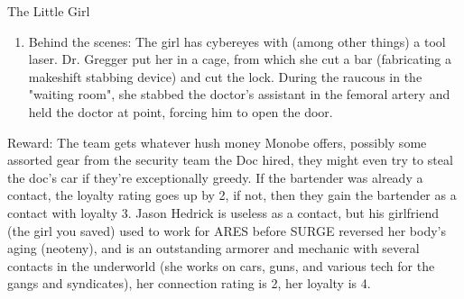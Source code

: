 \begin{scenario}{The Little Girl}
\begin{enumerate}
\item Behind the scenes: The girl has cybereyes with (among other things) a tool laser. Dr. Gregger put her in a cage, from which she cut a bar (fabricating a makeshift stabbing device) and cut the lock. During the raucous in the "waiting room", she stabbed the doctor's assistant in the femoral artery and held the doctor at point, forcing him to open the door.

\end{enumerate}

Reward: The team gets whatever hush money Monobe offers, possibly some assorted gear from the security team the Doc hired, they might even try to steal the doc's car if they're exceptionally greedy. If the bartender was already a contact, the loyalty rating goes up by 2, if not, then they gain the bartender as a contact with loyalty 3. Jason Hedrick is useless as a contact, but his girlfriend (the girl you saved) used to work for ARES before SURGE reversed her body's aging (neoteny), and is an outstanding armorer and mechanic with several contacts in the underworld (she works on cars, guns, and various tech for the gangs and syndicates), her connection rating is 2, her loyalty is 4. 

\end{scenario}